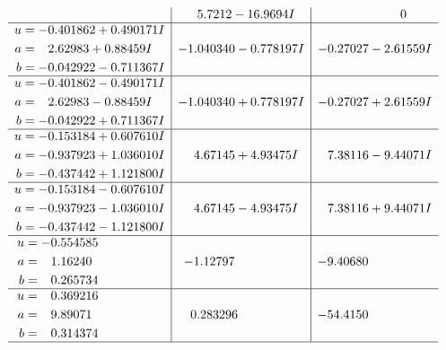\documentclass[1p]{elsarticle_modified}
\theoremstyle{definition}
\begin{document}
$$\begin{array}{c|c|c}
 & \phantom{-}5.7212 - 16.9694 I & \phantom{-0.000000 } 0 \\ \hline\begin{aligned}
u &= -0.401862 + 0.490171 I \\
a &= \phantom{-}2.62983 + 0.88459 I \\
b &= -0.042922 - 0.711367 I\end{aligned}
 & -1.040340 - 0.778197 I & -0.27027 - 2.61559 I \\ \hline\begin{aligned}
u &= -0.401862 - 0.490171 I \\
a &= \phantom{-}2.62983 - 0.88459 I \\
b &= -0.042922 + 0.711367 I\end{aligned}
 & -1.040340 + 0.778197 I & -0.27027 + 2.61559 I \\ \hline\begin{aligned}
u &= -0.153184 + 0.607610 I \\
a &= -0.937923 + 1.036010 I \\
b &= -0.437442 + 1.121800 I\end{aligned}
 & \phantom{-}4.67145 + 4.93475 I & \phantom{-}7.38116 - 9.44071 I \\ \hline\begin{aligned}
u &= -0.153184 - 0.607610 I \\
a &= -0.937923 - 1.036010 I \\
b &= -0.437442 - 1.121800 I\end{aligned}
 & \phantom{-}4.67145 - 4.93475 I & \phantom{-}7.38116 + 9.44071 I \\ \hline\begin{aligned}
u &= -0.554585\phantom{ +0.000000I} \\
a &= \phantom{-}1.16240\phantom{ +0.000000I} \\
b &= \phantom{-}0.265734\phantom{ +0.000000I}\end{aligned}
 & -1.12797\phantom{ +0.000000I} & -9.40680\phantom{ +0.000000I} \\ \hline\begin{aligned}
u &= \phantom{-}0.369216\phantom{ +0.000000I} \\
a &= \phantom{-}9.89071\phantom{ +0.000000I} \\
b &= \phantom{-}0.314374\phantom{ +0.000000I}\end{aligned}
 & \phantom{-}0.283296\phantom{ +0.000000I} & -54.4150\phantom{ +0.000000I}\\
 \hline 
 \end{array}$$\newpage\newpage\renewcommand{\arraystretch}{1}
\end{document}
